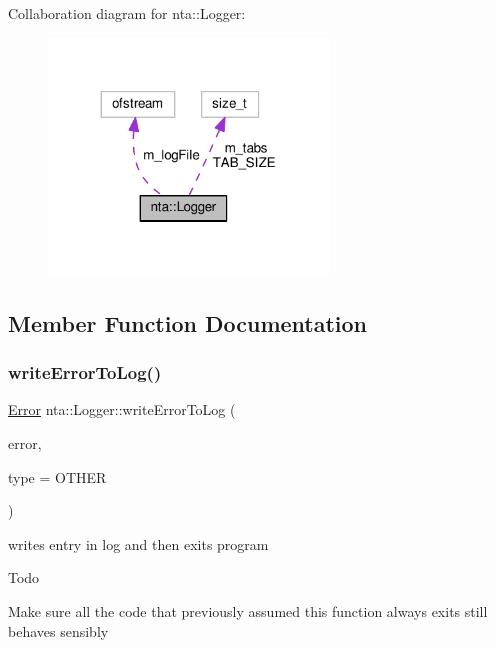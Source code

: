 Collaboration diagram for nta\+:\+:Logger\+:\nopagebreak
\begin{figure}[H]
\begin{center}
\leavevmode
\includegraphics[width=212pt]{d4/d22/classnta_1_1Logger__coll__graph}
\end{center}
\end{figure}


\subsection{Member Function Documentation}
\mbox{\label{classnta_1_1Logger_a22e0cfbb0e04de2c377cdd5297c39eee}} 
\subsubsection{\texorpdfstring{write\+Error\+To\+Log()}{writeErrorToLog()}}
{\footnotesize\ttfamily \hyperlink{structnta_1_1Error}{Error} nta\+::\+Logger\+::write\+Error\+To\+Log (\begin{DoxyParamCaption}\item[{crstring}]{error,  }\item[{\hyperlink{namespacenta_a1ddeff35318678e360dfa44ca9577b16}{Error\+Type}}]{type = {\ttfamily OTHER} }\end{DoxyParamCaption})\hspace{0.3cm}{\ttfamily [static]}}



writes entry in log and then exits program 

\begin{DoxyRefDesc}{Todo}
\item[\hyperlink{todo__todo000012}{Todo}]Make sure all the code that previously assumed this function always exits still behaves sensibly \end{DoxyRefDesc}


